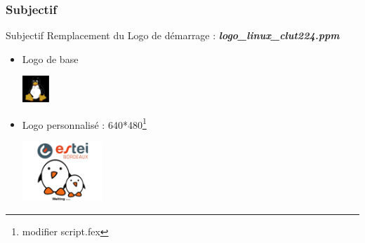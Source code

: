 \documentclass[11pt]{beamer}
\begin{document}
	\subsubsection{Subjectif}
	\begin{frame}{Subjectif}
	Remplacement du Logo de démarrage : {\itshape \bfseries logo\string_linux\string_clut224.ppm}
	 \newline
	\begin{itemize}
	\item Logo de base 
		\begin{center}
		 \includegraphics[width=1cm]{common/logo_1.png}
		\end{center}
	\item Logo personnalisé : 640*480\footnote{modifier script.fex}
		\begin{center}
		 \includegraphics[width=3cm]{common/logo_2.png}
		\end{center}
	\end{itemize}
	\end{frame}
	
\end{document}
